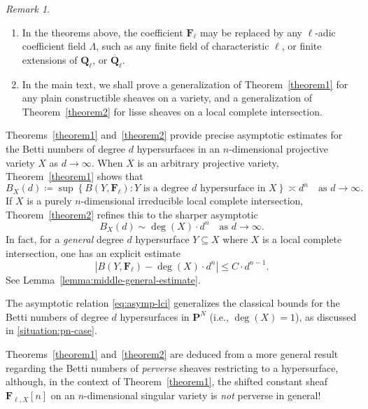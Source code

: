 \documentclass[english]{smfart}
\renewcommand{\mathbb}{\mathbf}
\renewcommand{\leq}{\leqslant}
\renewcommand{\subset}{\subseteq}
\theoremstyle{remark}
\newtheorem{remark}{Remark}[subsection]
\theoremstyle{plain}
\theoremstyle{definition}
\numberwithin{equation}{remark}
\theoremstyle{void}
\begin{document}
\begin{remark}
\begin{enumerate}[wide]
\item In the theorems above, the coefficient \(\mathbb{F}_{\ell}\) may
be replaced by any \(\ell\)-adic coefficient field \(\Lambda\), such
as any finite field of characteristic \(\ell\), or finite extensions
of \(\mathbb{Q}_{\ell}\), or \(\overline{\mathbb{Q}}_{\ell}\).
\item In the main text, we shall prove a generalization of
Theorem~\ref{theorem1} for any plain constructible sheaves on a
variety, and a generalization of Theorem~\ref{theorem2} for lisse
sheaves on a local complete intersection.
\end{enumerate}
\end{remark}


Theorems~\ref{theorem1} and~\ref{theorem2} provide precise asymptotic
estimates for the Betti numbers of degree \(d\) hypersurfaces in an
\(n\)-dimensional projective variety \(X\) as \(d \to \infty\).  When
\(X\) is an arbitrary projective variety, Theorem~\ref{theorem1}
shows that
\begin{equation}
\label{eq:asymp-general}
B_X(d) \coloneq \sup \left\{ B(Y, \mathbb{F}_{\ell}) : Y \text{ is a degree } d
\text{ hypersurface in } X \right\}
\asymp d^n \quad \text{as } d \to \infty.
\end{equation}
If \(X\) is a purely \(n\)-dimensional irreducible local complete
intersection, Theorem~\ref{theorem2} refines this to the sharper
asymptotic
\begin{equation}
\label{eq:asymp-lci}
B_X(d) \sim \deg(X) \cdot d^n \quad \text{as } d \to \infty.
\end{equation}
In fact, for a \emph{general} degree \(d\) hypersurface
\(Y \subset X\) where \(X\) is a local complete intersection, one
has an explicit estimate
\[
|B(Y, \mathbb{F}_{\ell}) - \deg(X) \cdot d^n | \leq C \cdot d^{n-1}.
\]
See Lemma~\ref{lemma:middle-general-estimate}.

The asymptotic relation \eqref{eq:asymp-lci} generalizes the
classical bounds for the Betti numbers of degree \(d\) hypersurfaces
in \(\mathbb{P}^N\) (i.e., \(\deg(X) = 1\)), as discussed in
\ref{situation:pn-case}.



Theorems~\ref{theorem1} and~\ref{theorem2} are deduced from a more
general result regarding the Betti numbers of \emph{perverse} sheaves
restricting to a hypersurface, although, in the context of
Theorem~\ref{theorem1}, the shifted constant sheaf
\(\mathbb{F}_{\ell,X}[n]\) on an \(n\)-dimensional singular variety is
\emph{not} perverse in general!
\end{document}
